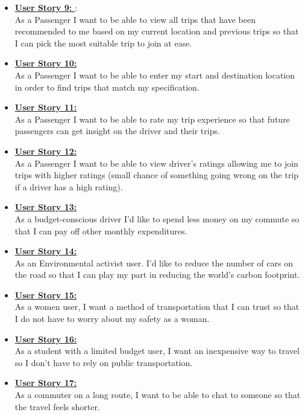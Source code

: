 \documentclass[hidelinks, 12pt, a4paper]{article}
\begin{document}
\begin{itemize}
      \item \textbf{\underline{User Story 9: }}: \\
            As a Passenger I want to be able to view all trips that have been recommended to me based on my current location and previous trips so that I can pick the most suitable trip to join at ease.
      \item \textbf{\underline{User Story 10: }} \\
            As a Passenger I want to be able to enter my start and destination location in order to find trips that match my specification.
      \item \textbf{\underline{User Story 11: }} \\
            As a Passenger I want to be able to rate my trip experience so that future passengers can get insight on the driver and their trips.
      \item \textbf{\underline{User Story 12: }} \\
            As a Passenger I want to be able to view driver's ratings allowing me to join trips with higher ratings (small chance of something going wrong on the trip if a driver has a high rating).
      \item \textbf{\underline{User Story 13: }} \\
            As a budget-conscious driver  I'd like to spend less money on my commute so that I can pay off other monthly expenditures.
      \item \textbf{\underline{User Story 14: }} \\
            As an Environmental activist user. I'd like to reduce the number of cars on the road so that I can play my part in reducing the world’s carbon footprint.
      \item \textbf{\underline{User Story 15: }} \\
            As a women user, I want a method of transportation that I can trust so that I do not have to worry about my safety as a woman.
      \item \textbf{\underline{User Story 16: }} \\
            As a student with a limited budget user, I want an inexpensive way to travel so I don't have to rely on public transportation.
      \item \textbf{\underline{User Story 17: }} \\
            As a commuter on a long route, I want to be able to chat to someone so that the travel feels shorter.


\end{itemize}
\end{document}
